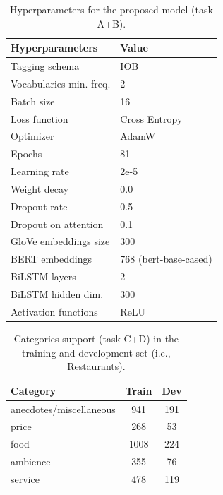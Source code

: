 \documentclass[11pt,a4paper]{article}
\begin{document}
	\begin{table}[H]
		\centering
		\begin{tabular}{@{}ll@{}}
			\toprule
			\textbf{Hyperparameters} & Value                 \\ \midrule
			Tagging schema                            & IOB                   \\
			Vocabularies min. freq.                   & 2                     \\
			Batch size                                & 16                    \\
			Loss function                             & Cross Entropy         \\
			Optimizer                                 & AdamW                 \\
			Epochs                                    & 81 \\
			Learning rate                             & 2e-5                  \\
			Weight decay                              & 0.0                   \\
			Dropout rate                              & 0.5                   \\
			Dropout on attention                      & 0.1                   \\
			GloVe embeddings size                     & 300                   \\
			BERT embeddings                           & 768 (bert-base-cased) \\
			BiLSTM layers                             & 2                     \\
			BiLSTM hidden dim.                        & 300                   \\
			Activation functions                      & ReLU                  \\ \bottomrule
		\end{tabular}
		\caption{Hyperparameters for the proposed model (task A+B).}
		\label{tab:hyperparams}
	\end{table}

	
	
	\begin{table}[H]
		\centering
		\begin{tabular}{@{}lcc@{}}
			\toprule
			\textbf{Category}         & Train     & Dev \\ \midrule
			anecdotes/miscellaneous   & 941       & 191     \\
			price                     & 268       & 53      \\
			food                      & 1008      & 224     \\
			ambience                  & 355       & 76      \\
			service                   & 478       & 119     \\ \bottomrule
		\end{tabular}
		\caption{Categories support (task C+D) in the training and development set
			(i.e., Restaurants).}
		\label{tab:cd_categories_support}
	\end{table}
	
\end{document}
